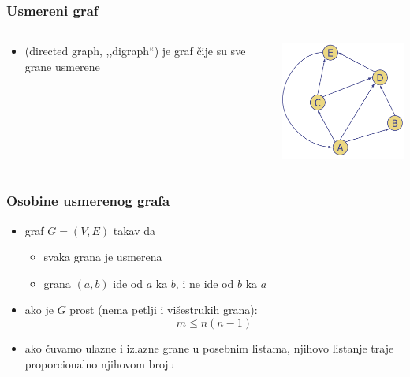 \documentclass[compress,aspectratio=169]{beamer}
\begin{document}
\begin{frame}[fragile]
  \frametitle{Usmereni graf}
  \begin{columns}
    \begin{column}[t]{6cm}
      \begin{itemize}
        \item {} (directed graph, ,,digraph``) je 
          graf čije su sve grane usmerene
      \end{itemize}
    \end{column}
    \begin{column}[t]{6cm}
      \begin{center}
        \includegraphics[width=5cm]{asp-14-pic28.png}
      \end{center}
    \end{column}
  \end{columns}
\end{frame}

\begin{frame}[fragile]
  \frametitle{Osobine usmerenog grafa}
  \begin{itemize}
    \item graf $G=(V,E)$ takav da
    \begin{itemize}
      \item svaka grana je usmerena
      \item grana $(a,b)$ ide od $a$ ka $b$, i ne ide od $b$ ka $a$
    \end{itemize}
    \item ako je $G$ prost (nema petlji i višestrukih grana): $$m\leq n(n-1)$$
    \item ako čuvamo ulazne i izlazne grane u posebnim listama, njihovo
      listanje traje proporcionalno njihovom broju
  \end{itemize}
\end{frame}
\end{document}
